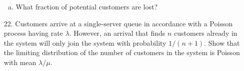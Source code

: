 \documentclass{article}
\begin{document}
\begin{itemize}
\begin{enumerate}[(a)]
			\item What fraction of potential customers are lost?
				
		\end{enumerate}

	\item[22.] Customers arrive at a single-server queue in accordance with a Poisson process having rate $\lambda.$ However, an arrival that finds $n$ customers already in the system will only join the system with probability $1/(n+1).$ Show that the limiting distribution of the number of customers in the system is Poisson with mean $\lambda/\mu.$
		
\end{itemize}
\end{document}
